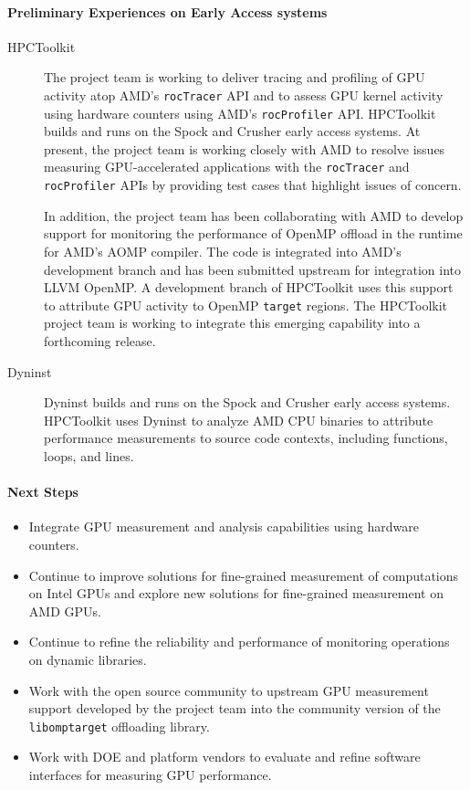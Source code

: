 \paragraph{Preliminary Experiences on Early Access systems}
\begin{description}
\item[HPCToolkit]
The project team is working to deliver tracing and profiling of GPU activity atop AMD's {\tt rocTracer} API and to assess GPU kernel activity using hardware counters using AMD's {\tt rocProfiler} API. 
HPCToolkit builds and runs on the Spock and Crusher early access systems. 
At present, the project team is working closely with AMD to 
resolve issues measuring GPU-accelerated
applications with the {\tt rocTracer} and {\tt rocProfiler} APIs
by providing test cases that highlight issues of concern.

In addition, the project team has been collaborating with AMD to develop
support for monitoring the performance of OpenMP offload in the
runtime for AMD's AOMP compiler. The code is integrated into AMD's development
branch and has been submitted upstream
for integration into LLVM OpenMP.  A development branch of HPCToolkit
uses this support to attribute GPU activity to OpenMP {\tt target}
regions. The HPCToolkit project team is working to integrate this 
emerging capability into a forthcoming release.
\item[Dyninst]
Dyninst builds and runs on the Spock and Crusher early access systems. 
HPCToolkit uses Dyninst to analyze AMD CPU binaries to attribute 
performance measurements to source code contexts, 
including functions, loops, and lines.   
\end{description}

\paragraph{Next Steps}
\begin{itemize}

\item 
Integrate GPU measurement and analysis capabilities using hardware counters.

\item 
Continue to improve solutions for fine-grained measurement of computations on Intel GPUs and explore new solutions for fine-grained measurement on AMD GPUs.

\item 
Continue to refine the reliability and performance of monitoring operations on dynamic libraries.

\item 
Work with the open source community to upstream GPU measurement support
developed by the project team into the community version of the {\tt
libomptarget} offloading library.

\item 
Work with DOE and platform vendors to evaluate and refine software interfaces for measuring GPU performance.

\end{itemize}
